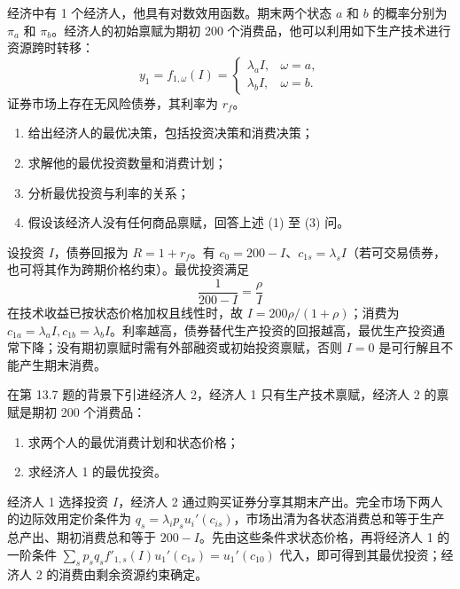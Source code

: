 \begin{problem}
 经济中有 1 个经济人，他具有对数效用函数。期末两个状态 $a$ 和 $b$ 的概率分别为 $\pi_a$ 和 $\pi_b$。经济人的初始禀赋为期初 \num{200} 个消费品，他可以利用如下生产技术进行资源跨时转移：
\[
    y_1=f_{1,\omega}(I)=
    \begin{cases}
        \lambda_a I, & \omega=a,\\
        \lambda_b I, & \omega=b.
    \end{cases}
\]
证券市场上存在无风险债券，其利率为 $r_f$。
\begin{enumerate}[label=(\alph*)]
    \item 给出经济人的最优决策，包括投资决策和消费决策；
    \item 求解他的最优投资数量和消费计划；
    \item 分析最优投资与利率的关系；
    \item 假设该经济人没有任何商品禀赋，回答上述 (1) 至 (3) 问。
\end{enumerate}
\end{problem}
\begin{solution}
设投资 $I$，债券回报为 $R=1+r_f$。有 $c_0=200-I$、$c_{1s}=\lambda_sI$（若可交易债券，也可将其作为跨期价格约束）。最优投资满足
\[
\frac1{200-I}=\frac{\rho}{I}
\]
在技术收益已按状态价格加权且线性时，故 $I=200\rho/(1+\rho)$；消费为 $c_{1a}=\lambda_aI,c_{1b}=\lambda_bI$。利率越高，债券替代生产投资的回报越高，最优生产投资通常下降；没有期初禀赋时需有外部融资或初始投资禀赋，否则 $I=0$ 是可行解且不能产生期末消费。
\end{solution}
\begin{problem}
 在第 13.7 题的背景下引进经济人 2，经济人 1 只有生产技术禀赋，经济人 2 的禀赋是期初 \num{200} 个消费品：
\begin{enumerate}[label=(\alph*)]
    \item 求两个人的最优消费计划和状态价格；
    \item 求经济人 1 的最优投资。
\end{enumerate}
\end{problem}
\begin{solution}
经济人 1 选择投资 $I$，经济人 2 通过购买证券分享其期末产出。完全市场下两人的边际效用定价条件为 $q_s=\lambda_i p_su_i'(c_{is})$，市场出清为各状态消费总和等于生产总产出、期初消费总和等于 $200-I$。先由这些条件求状态价格，再将经济人 1 的一阶条件 $\sum_sp_sq_s f'_{1,s}(I)u_1'(c_{1s})=u_1'(c_{10})$ 代入，即可得到其最优投资；经济人 2 的消费由剩余资源约束确定。
\end{solution}
